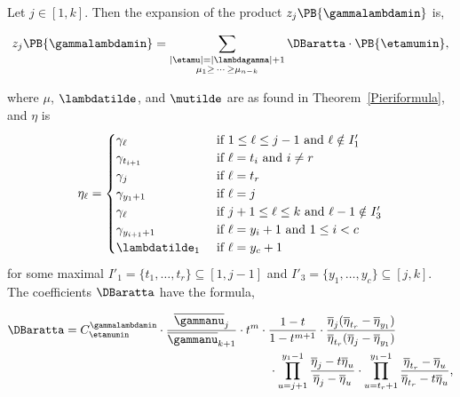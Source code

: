 \begin{thm}\label{nonsymmetricformula} Let $j \in [1,k]$. Then the expansion of the product $z_j \PB{\gammalambdamin}$ is,

\begin{equation} \label{monomialexpansion} z_j \PB{\gammalambdamin} =\sum_{\substack{|\etamu| = |\lambdagamma| + 1 \\ \mu_1 \geq \, \dotsm \, \geq \mu_{n-k}}}  \DBaratta \cdot \PB{\etamumin}, \end{equation}

where $\mu$, $\lambdatilde$, and $\mutilde$ are as found in Theorem~\ref{Pieriformula}, and $\eta$ is
\begin{align}
    \eta_\ell = \begin{cases}
    \gamma_\ell  &\text{ if } 1\leq \ell\leq j-1 \text{ and } \ell \notin I'_1\\
    \gamma_{t_{i+1}} &\text{ if } \ell = t_i \text{ and } i\neq r\\
    \gamma_j &\text{ if } \ell = t_r\\
    \gamma_{y_1+1} &\text{ if } \ell = j\\
    \gamma_\ell &\text{ if } j+1 \leq \ell \leq k \text{ and } \ell-1 \notin I'_3\\
    \gamma_{y_{i+1}+1} &\text{ if } \ell=y_i+1 \text{ and } 1\leq i < c\\
    \lambdatilde_1 &\text{ if } \ell = y_c+1
    \end{cases}
\end{align}
for some maximal $I'_1 = \{t_1, \dotsc, t_r\} \subseteq [1,j-1]$ and $I'_3 = \{y_1, \dotsc, y_c\} \subseteq [j,k]$. The coefficients $\DBaratta$ have the formula,

\begin{align*} \DBaratta &= C_{\etamumin}^{\gammalambdamin} \cdot \frac{ \overline{\gammanu}_j}{ \overline{\gammanu}_{k+1}} \cdot t^m \cdot \frac{1-t}{1-t^{m+1}} \cdot  \frac{\overline{\eta}_j(\overline{\eta}_{t_r} - \overline{\eta}_{y_1})}{\overline{\eta}_{t_r}(\overline{\eta}_j-\overline{\eta}_{y_1})} \\ &\hspace*{6cm} \cdot \prod_{u=j+1}^{y_1-1} \frac{\overline{\eta}_j-t\overline{\eta}_u}{\overline{\eta}_j-\overline{\eta}_u} \cdot \prod_{u=t_r+1}^{y_1-1} \frac{\overline{\eta}_{t_r}-\overline{\eta}_u}{\overline{\eta}_{t_r}-t\overline{\eta}_u},\end{align*}



\end{thm}




